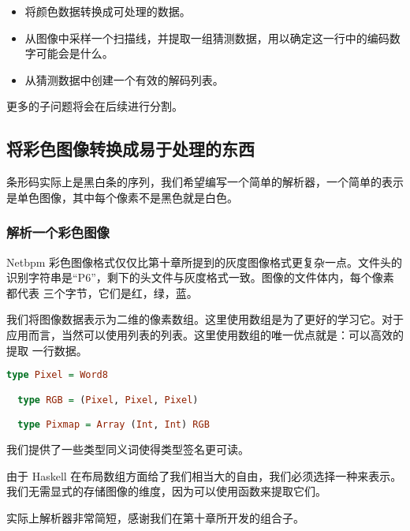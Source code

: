 \documentclass[./main.tex]{subfiles}
\begin{document}
\begin{itemize}
  \item 将颜色数据转换成可处理的数据。
  \item 从图像中采样一个扫描线，并提取一组猜测数据，用以确定这一行中的编码数字可能会是什么。
  \item 从猜测数据中创建一个有效的解码列表。
\end{itemize}

更多的子问题将会在后续进行分割。

\subsection*{将彩色图像转换成易于处理的东西}

条形码实际上是黑白条的序列，我们希望编写一个简单的解析器，一个简单的表示是单色图像，其中每个像素不是黑色就是白色。

\subsubsection*{解析一个彩色图像}

Netbpm 彩色图像格式仅仅比第十章所提到的灰度图像格式更复杂一点。文件头的识别字符串是“P6”，剩下的头文件与灰度格式一致。图像的文件体内，每个像素都代表
三个字节，它们是红，绿，蓝。

我们将图像数据表示为二维的像素数组。这里使用数组是为了更好的学习它。对于应用而言，当然可以使用列表的列表。这里使用数组的唯一优点就是：可以高效的提取
一行数据。

\begin{lstlisting}[language=Haskell]
  type Pixel = Word8

  type RGB = (Pixel, Pixel, Pixel)

  type Pixmap = Array (Int, Int) RGB
\end{lstlisting}

我们提供了一些类型同义词使得类型签名更可读。

由于 Haskell 在布局数组方面给了我们相当大的自由，我们必须选择一种来表示。我们无需显式的存储图像的维度，因为可以使用函数来提取它们。

实际上解析器非常简短，感谢我们在第十章所开发的组合子。
\end{document}
